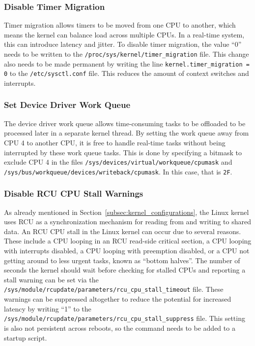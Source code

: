 \documentclass[MMR,Master,english]{style/twbook}
\begin{document}
\clearpage

\subsubsection{Disable Timer Migration}
Timer migration allows timers to be moved from one CPU to another, which means the kernel can balance load across multiple CPUs. In a real-time system, this can introduce latency and jitter. To disable timer migration, the value ``0'' needs to be written to the \texttt{/proc/sys/kernel/timer\_migration} file. This change also needs to be made permanent by writing the line \texttt{kernel.timer\_migration = 0} to the \texttt{/etc/sysctl.conf} file. This reduces the amount of context switches and interrupts.

\subsubsection{Set Device Driver Work Queue}
The device driver work queue allows time-consuming tasks to be offloaded to be processed later in a separate kernel thread. By setting the work queue away from CPU 4 to another CPU, it is free to handle real-time tasks without being interrupted by these work queue tasks. This is done by specifying a bitmask to exclude CPU 4 in the files \texttt{/sys/devices/virtual/workqueue/cpumask} and \texttt{/sys/bus/workqueue/devices/writeback/cpumask}. In this case, that is \texttt{2F}.

\subsubsection{Disable RCU CPU Stall Warnings}
As already mentioned in Section~\ref{subsec:kernel_configurations}, the Linux kernel uses RCU as a synchronization mechanism for reading from and writing to shared data. An RCU CPU stall in the Linux kernel can occur due to several reasons. These include a CPU looping in an RCU read-side critical section, a CPU looping with interrupts disabled, a CPU looping with preemption disabled, or a CPU not getting around to less urgent tasks, known as “bottom halves”. The number of seconds the kernel should wait before checking for stalled CPUs and reporting a stall warning can be set via the \texttt{/sys/module/rcupdate/parameters/rcu\_cpu\_stall\_timeout} file. These warnings can be suppressed altogether to reduce the potential for increased latency by writing ``1'' to the \texttt{/sys/module/rcupdate/parameters/rcu\_cpu\_stall\_suppress} file. This setting is also not persistent across reboots, so the command needs to be added to a startup script.
\end{document}
